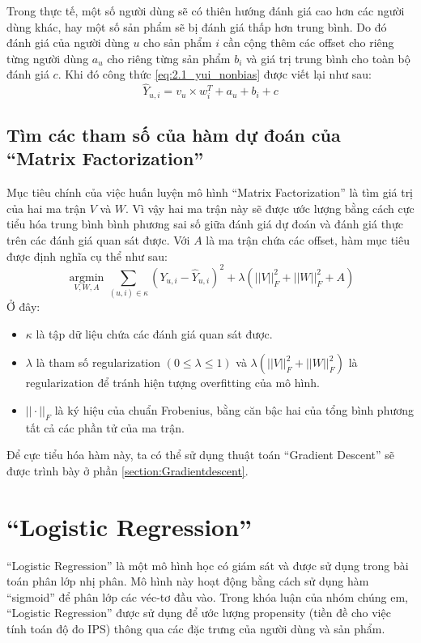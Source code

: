 Trong thực tế, một số người dùng sẽ có thiên hướng đánh giá cao hơn các người dùng khác, hay một số sản phẩm sẽ bị đánh giá thấp hơn trung bình. Do đó đánh giá của người dùng $u$ cho sản phẩm $i$ cần cộng thêm các offset cho riêng từng người dùng $a_u$ cho riêng từng sản phẩm $b_i$ và giá trị trung bình cho toàn bộ đánh giá $c$. Khi đó công thức \ref{eq:2.1_yui_nonbias} được viết lại như sau:
\begin{equation}
\label{eq:2.1_yui_bias}
    \hat{Y}_{u,i} = v_{u}\times w_i^{T} + a_u + b_i + c
\end{equation}
\subsection{Tìm các tham số của hàm dự đoán của ``Matrix Factorization''}
Mục tiêu chính của việc huấn luyện mô hình ``Matrix Factorization'' là tìm giá trị của hai ma trận $V$ và $W$. Vì vậy hai ma trận này sẽ được ước lượng bằng cách cực tiểu hóa trung bình bình phương sai số giữa đánh giá dự đoán và đánh giá thực trên các đánh giá quan sát được. Với $A$ là ma trận chứa các offset, hàm mục tiêu được định nghĩa cụ thể như sau:
\begin{equation}
\label{eq:2.1_objective}
    \operatorname*{argmin}_{V,W,A} \sum_{(u,i)\in\kappa} (Y_{u,i} - \hat{Y}_{u,i})^2 + \lambda(||V||_{F}^2 + ||W||_{F}^2+A)
\end{equation}
Ở đây: 
\begin{itemize}
    \item $\kappa$ là tập dữ liệu chứa các đánh giá quan sát được.
    \item $\lambda$ là tham số regularization $(0 \leq \lambda \leq 1)$ và $\lambda(||V||_{F}^2 + ||W||_{F}^2)$ là regularization để tránh hiện tượng overfitting của mô hình.
    \item $||\cdot||_{F}$ là ký hiệu của chuẩn Frobenius, bằng căn bậc hai của tổng bình phương tất cả các phần tử của ma trận.
\end{itemize}

Để cực tiểu hóa hàm này, ta có thể sử dụng thuật toán ``Gradient Descent'' sẽ được trình bày ở phần \ref{section:Gradientdescent}.

\section{``Logistic Regression''}
``Logistic Regression'' là một mô hình học có giám sát và được sử dụng trong bài toán phân lớp nhị phân. Mô hình này hoạt động bằng cách sử dụng hàm ``sigmoid'' để phân lớp các véc-tơ đầu vào. Trong khóa luận của nhóm chúng em, ``Logistic Regression'' được sử dụng để ước lượng propensity (tiền đề cho việc tính toán độ đo IPS) thông qua các đặc trưng của người dùng và sản phẩm.


